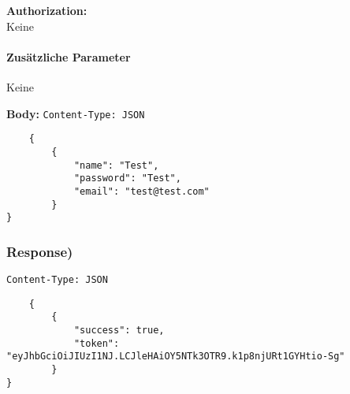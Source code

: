\textbf{Authorization:} \\
Keine

\paragraph{Zusätzliche Parameter}
Keine

\textbf{Body:}
\lstinline{Content-Type: JSON}
\begin{lstlisting}
    {
        {
            "name": "Test",
            "password": "Test",
            "email": "test@test.com"
        }  
}

\end{lstlisting}
\subsubsection{Response)}

\lstinline{Content-Type: JSON}
\begin{lstlisting}
    {
        {
            "success": true,
            "token": "eyJhbGciOiJIUzI1NJ.LCJleHAiOY5NTk3OTR9.k1p8njURt1GYHtio-Sg"
        }
}
\end{lstlisting}

\pagebreak